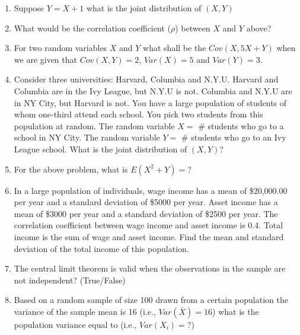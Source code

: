 \documentclass{article}
\begin{document}
\begin{enumerate}
\item Suppose $Y=X+1$ what is the joint distribution of $(X,Y)$

\vspace{5cm}

\item What would be the correlation coefficient ($\rho$) between $X$ and $Y$ above?

\vspace{5cm}

\item For two random variables $X$ and $Y$ what shall be the $Cov(X, 5X+Y)$ when we are given that $Cov(X,Y)=2$, $Var(X)=5$ and $Var(Y)=3$.
\newpage
\item Consider three universities: Harvard, Columbia and N.Y.U. Harvard and Columbia are in the Ivy League, but N.Y.U is not. Columbia and N.Y.U are in NY City, but Harvard is not. You have a large population of students of whom one-third attend each school. You pick two students from this population at random. The random variable $X=$ \# students who go to a school in NY City. The random variable $Y=$ \# students who go to an Ivy League school. What is the joint distribution of $(X,Y)$?
\vspace{7cm}

\item For the above problem, what is $E(X^2+Y)=?$
\vspace{7cm}

\item In a large population of individuals, wage income has a mean of \$20,000.00 per year and a standard deviation of \$5000 per year. Asset income has a mean of \$3000 per year and a standard deviation of \$2500 per year. The correlation coefficient between wage income and asset income is 0.4. Total income is the sum of wage and  asset income. Find the mean and standard deviation of the total income of this population.
\vspace{7cm}


\item The central limit  theorem is valid when the observations in the sample are not independent? (True/False)
\vspace{3cm}

\item Based on a random sample of size 100 drawn from a certain population the variance of the sample mean is 16 (i.e., $Var(\bar{X})=16$) what is the population variance equal to (i.e., $Var(X_{i})=?$)
\vspace{3cm}


\end{enumerate}
\end{document}
